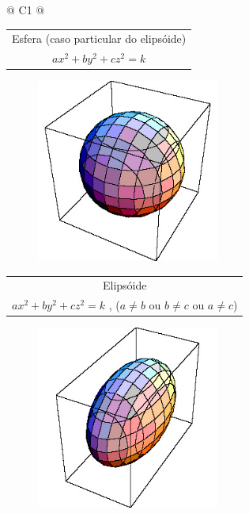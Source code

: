 \begin{longtable}{
		@{}
		C{1\textwidth} 
		@{}}
\begin{tabular}[c]{@{}c@{}}
				{\large Esfera (caso particular do elipsóide)} \\

				{\large $ax^{2} + by^{2} + cz^{2} = k$} \\
				
			\end{tabular}

			\begin{figure}[H]
			    \centering
				\includegraphics[height=6cm]{images/ufmg_figura-1-1}
			\end{figure}
			\tabularnewline
			\midrule
			\begin{tabular}[c]{@{}c@{}} 

				{\large Elipsóide} \\

				{\large $ax^{2} + by^{2} + cz^{2} = k$} , ($a \neq b$ ou $b \neq c$ ou $a \neq c$)\\

            \end{tabular}

			\begin{figure}[H]
			    \centering
				\includegraphics[height=6cm]{images/ufmg_figura-1-2}
			\end{figure}
			\tabularnewline
			\midrule
			\begin{tabular}[c]{@{}c@{}} 


\end{tabular}
\end{longtable}
